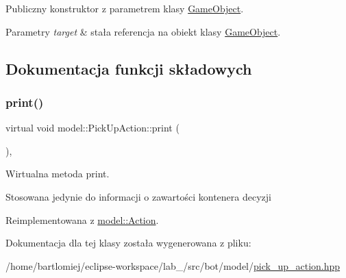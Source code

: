Publiczny konstruktor z parametrem klasy \hyperlink{classmodel_1_1GameObject}{Game\+Object}. 


\begin{DoxyParams}{Parametry}
{\em target} & stała referencja na obiekt klasy \hyperlink{classmodel_1_1GameObject}{Game\+Object}. \\
\hline
\end{DoxyParams}


\subsection{Dokumentacja funkcji składowych}
\mbox{\label{classmodel_1_1PickUpAction_a8e3d6499d8eb1f99566e0b5b3e6661c9}} 
\subsubsection{\texorpdfstring{print()}{print()}}
{\footnotesize\ttfamily virtual void model\+::\+Pick\+Up\+Action\+::print (\begin{DoxyParamCaption}{ }\end{DoxyParamCaption})\hspace{0.3cm}{\ttfamily [inline]}, {\ttfamily [virtual]}}



Wirtualna metoda print. 

Stosowana jedynie do informacji o zawartości kontenera decyzji 

Reimplementowana z \hyperlink{classmodel_1_1Action_a2955dbb4a69e38a48aa07d730fe2d77c}{model\+::\+Action}.



Dokumentacja dla tej klasy została wygenerowana z pliku\+:\begin{DoxyCompactItemize}
\item 
/home/bartlomiej/eclipse-\/workspace/lab\+\_/src/bot/model/\hyperlink{pick__up__action_8hpp}{pick\+\_\+up\+\_\+action.\+hpp}\end{DoxyCompactItemize}
